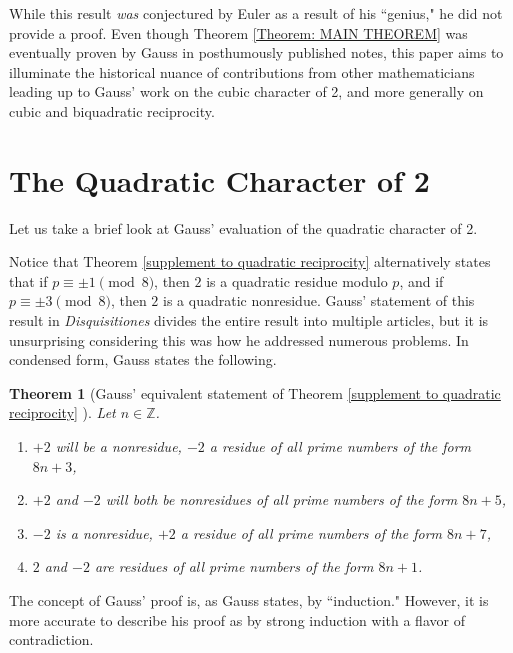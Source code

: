 \documentclass[10pt]{amsart}
\newcommand{\ZZ}{\mathbb{Z}}
\theoremstyle{plain}
\newtheorem{thm}{Theorem}
\theoremstyle{definition}
\theoremstyle{remark}
\numberwithin{equation}{section}
\begin{document}
While this result \textit{was} conjectured by Euler as a result of his ``genius," he did not provide a proof. Even though Theorem \ref{Theorem: MAIN THEOREM} was eventually proven by Gauss in posthumously published notes, this paper aims to illuminate the historical nuance of contributions from other mathematicians leading up to Gauss' work on the cubic character of 2, and more generally on cubic and biquadratic reciprocity. 

\section*{The Quadratic Character of 2}
Let us take a brief look at Gauss' evaluation of the quadratic character of 2. 

\indent Notice that Theorem \ref{supplement to quadratic reciprocity} alternatively states that if $p\equiv \pm 1\pmod{8}$, then $2$ is a quadratic residue modulo $p$, and if $p\equiv \pm 3\pmod{8}$, then $2$ is a quadratic nonresidue. Gauss' statement of this result in \textit{Disquisitiones} divides the entire result into multiple articles, but it is unsurprising considering this was how he addressed numerous problems. In condensed form, Gauss states the following.
\begin{thm}[Gauss' equivalent statement of Theorem \ref{supplement to quadratic reciprocity} \cite{Gauß_1986} \label{Proposition: Gauss form of quad char of 2}]
Let $n\in\ZZ$.
    \begin{enumerate}
        \item $+2$ will be a nonresidue, $-2$ a residue of all prime numbers of the form $8n+3$,
        \item $+2$ and $-2$ will both be nonresidues of all prime numbers of the form $8n+5$,
        \item $-2$ is a nonresidue, $+2$ a residue of all prime numbers of the form $8n+7$,
        \item $2$ and $-2$ are residues of all prime numbers of the form $8n+1$. 
    \end{enumerate}
\end{thm}

The concept of Gauss' proof is, as Gauss states, by ``induction." However, it is more accurate to describe his proof as by strong induction with a flavor of contradiction. 
\end{document}
